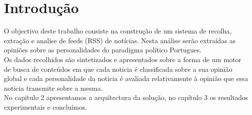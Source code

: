 \section{Introdução}
\hspace{15pt}O objectivo deste trabalho consiste na construção de um sistema de recolha, extração e analise de feeds (RSS) de notícias. Nesta análise serão extraídas as opiniões sobre as personalidades do paradigma político Portugues.\\
Os dados recolhidos são sintetizados e apresentados sobre a forma de um motor de busca de conteúdos em que cada noticia é classificada sobre a sua opinião global e cada personalidade da noticia é avaliada relativamente à opinião que essa noticia transmite sobre a mesma.\\
No capitulo 2 apresentamos a arquitectura da solução, no capítulo 3 os resultados experimentais e concluímos.